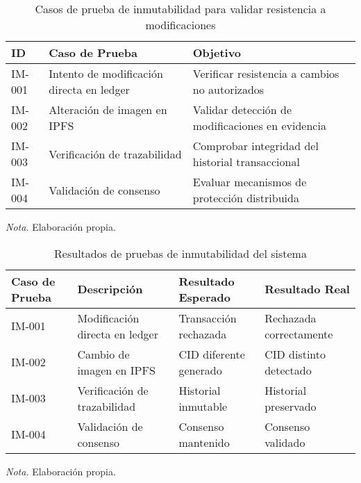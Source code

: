 \begin{table}[htbp]
    \centering
    \caption{Casos de prueba de inmutabilidad para validar resistencia a modificaciones}
    \begin{tabular}{p{2cm} p{6cm} p{4cm}}
        \toprule
        \textbf{ID} & \textbf{Caso de Prueba} & \textbf{Objetivo} \\
        \midrule
        IM-001 & Intento de modificación directa en ledger & Verificar resistencia a cambios no autorizados \\
        IM-002 & Alteración de imagen en IPFS & Validar detección de modificaciones en evidencia \\
        IM-003 & Verificación de trazabilidad & Comprobar integridad del historial transaccional \\
        IM-004 & Validación de consenso & Evaluar mecanismos de protección distribuida \\
        \bottomrule
    \end{tabular}
    \vspace{1em}
    \begin{flushleft}
        \textit{Nota.} Elaboración propia.
    \end{flushleft}
    \label{tab:casos_prueba_inmutabilidad}
\end{table}

\begin{table}[htbp]
    \centering
    \caption{Resultados de pruebas de inmutabilidad del sistema}
    \begin{tabular}{p{3cm} p{4cm} p{3cm} p{3cm}}
        \toprule
        \textbf{Caso de Prueba} & \textbf{Descripción} & \textbf{Resultado Esperado} & \textbf{Resultado Real} \\
        \midrule
        IM-001 & Modificación directa en ledger & Transacción rechazada & Rechazada correctamente \\
        IM-002 & Cambio de imagen en IPFS & CID diferente generado & CID distinto detectado \\
        IM-003 & Verificación de trazabilidad & Historial inmutable & Historial preservado \\
        IM-004 & Validación de consenso & Consenso mantenido & Consenso validado \\
        \bottomrule
    \end{tabular}
    \vspace{1em}
    \begin{flushleft}
        \textit{Nota.} Elaboración propia.
    \end{flushleft}
    \label{tab:resultados_inmutabilidad}
\end{table} 